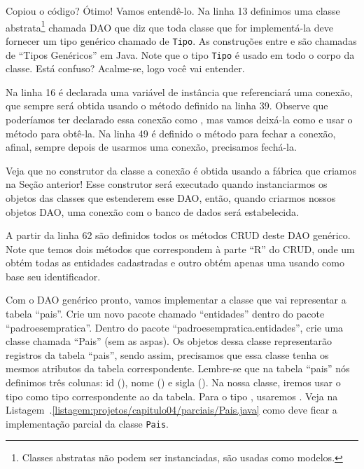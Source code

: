 
Copiou o código? Ótimo! Vamos entendê-lo. Na linha 13 definimos uma classe abstrata\footnote{Classes abstratas não podem ser instanciadas, são usadas como modelos.} chamada DAO que diz que toda classe que for implementá-la deve fornecer um tipo genérico chamado de \texttt{Tipo}. As construções entre \inlineJavaCode{<} e \inlineJavaCode{>} são chamadas de ``Tipos Genéricos'' em Java. Note que o tipo \texttt{Tipo} é usado em todo o corpo da classe. Está confuso? Acalme-se, logo você vai entender.

Na linha 16 é declarada uma variável de instância que referenciará uma conexão, que sempre será obtida usando o método  definido na linha 39. Observe que poderíamos ter declarado essa conexão como , mas vamos deixá-la como  e usar o método  para obtê-la. Na linha 49 é definido o método para fechar a conexão, afinal, sempre depois de usarmos uma conexão, precisamos fechá-la.

Veja que no construtor da classe a conexão é obtida usando a fábrica que criamos na Seção anterior! Esse construtor será executado quando instanciarmos os objetos das classes que estenderem esse DAO, então, quando criarmos nossos objetos DAO, uma conexão com o banco de dados será estabelecida.

A partir da linha 62 são definidos todos os métodos CRUD deste DAO genérico. Note que temos dois métodos que correspondem à parte ``R'' do CRUD, onde um obtém todas as entidades cadastradas e outro obtém apenas uma usando como base seu identificador.

Com o DAO genérico pronto, vamos implementar a classe que vai representar a tabela ``pais''. Crie um novo pacote chamado ``entidades'' dentro do pacote ``padroesempratica''. Dentro do pacote ``padroesempratica.entidades'', crie uma classe chamada ``Pais'' (sem as aspas). Os objetos dessa classe representarão registros da tabela ``pais'', sendo assim, precisamos que essa classe tenha os mesmos atributos da tabela correspondente. Lembre-se que na tabela ``pais'' nós definimos três colunas: id (), nome () e sigla (). Na nossa classe, iremos usar o tipo  como tipo correspondente ao  da tabela. Para o tipo , usaremos . Veja na Listagem~\thechapter.\ref{listagem:projetos/capitulo04/parciais/Pais.java} como deve ficar a implementação parcial da classe \texttt{Pais}.

